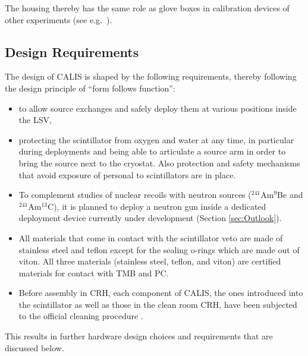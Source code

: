 The housing thereby has the same role as glove boxes in calibration devices of other experiments (see e.g.~\cite{KamLAND:Calib,Borexino:Calib}).

\subsection{Design Requirements}
The design of CALIS is shaped by the following requirements, thereby following the design principle of ``form follows function'': 
\begin{itemize}
\item to allow source exchanges and safely deploy them at various positions inside the LSV, 
\item protecting the scintillator from oxygen and water at any time, in particular during deployments and being able to articulate a source arm in order to bring the source next to the cryostat. Also protection and safety mechanisms that avoid exposure of personal to scintillators are in place.
\item To complement studies of nuclear recoils with neutron sources ($^{241}$Am$^{9}$Be and $^{241}$Am$^{13}$C), it is planned to deploy a neutron gun inside a dedicated deployment device currently under development (Section \ref{sec:Outlook}).
\item All materials that come in contact with the scintillator veto are made of stainless steel and teflon except for the sealing o-rings which are made out of viton.  All three materials (stainless steel, teflon, and viton) are certified materials for contact with TMB and PC.
\item Before assembly in CRH, each component of CALIS, the ones introduced into the scintillator as well as those in the clean room CRH, have been subjected to the official cleaning procedure \cite{DS50:cleaning}.
\end{itemize}

This results in further hardware design choices and requirements that are discussed below.